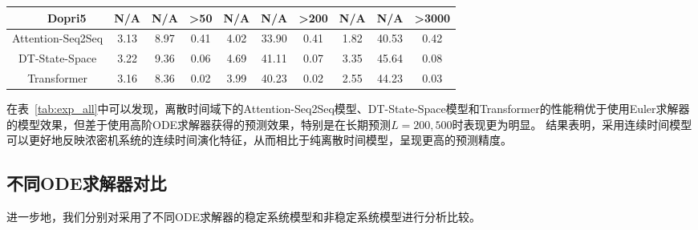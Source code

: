 \begin{table}[htpb]
{\begin{tabular}{c|c|ccccccccc}
                                                                                 & \multicolumn{1}{c|}{Dopri5}    & N/A                    & N/A                    & \multicolumn{1}{c|}{\textgreater{}50} & N/A                    & N/A                    & \multicolumn{1}{c|}{\textgreater{}200} & N/A                    & N/A                    & \textgreater{}3000   \\ \hline
\multicolumn{2}{c|}{Attention-Seq2Seq\cite{Member2019}}                                                                             & 3.13                 & 8.97                 & \multicolumn{1}{c|}{0.41}             & 4.02                 & 33.90                & \multicolumn{1}{c|}{0.41}              & 1.82                 & 40.53                & 0.42                 \\ \hline
\multicolumn{2}{c|}{DT-State-Space\cite{Rangapuram2018}}                                                                               & 3.22                 & 9.36                 & \multicolumn{1}{c|}{0.06}             & 4.69                 & 41.11                & \multicolumn{1}{c|}{0.07}              & 3.35                 & 45.64                & 0.08                 \\
\multicolumn{2}{c|}{Transformer\cite{Wu2020}}                                                                               & 3.16                 & 8.36                 & \multicolumn{1}{c|}{0.02}             & 3.99                 & 40.23                & \multicolumn{1}{c|}{0.02}              & 2.55                 & 44.23                & 0.03                 \\
\bottomrule
\end{tabular}}
\end{table}

在表~\ref{tab:exp_all}中可以发现，离散时间域下的Attention-Seq2Seq模型、DT-State-Space模型和Transformer的性能稍优于使用Euler求解器的模型效果，但差于使用高阶ODE求解器获得的预测效果，特别是在长期预测$L=200, 500$时表现更为明显。
结果表明，采用连续时间模型可以更好地反映浓密机系统的连续时间演化特征，从而相比于纯离散时间模型，呈现更高的预测精度。

\subsection{不同ODE求解器对比}
进一步地，我们分别对采用了不同ODE求解器的稳定系统模型和非稳定系统模型进行分析比较。

